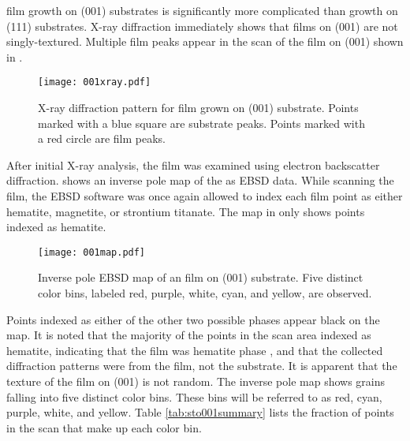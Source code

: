  film growth on (001) substrates is significantly more complicated than growth on (111) substrates. X-ray diffraction immediately shows that films on (001) are not singly-textured. Multiple film peaks appear in the \texttheta{} scan of the  film on (001) shown in . 
\begin{figure}
\centering
	\texttt{[image: 001xray.pdf]}
	\caption[XRD pattern for  film on ]{%
		X-ray diffraction pattern for  film grown on 
		 (001) substrate. Points marked with a blue 
		square are substrate peaks. Points marked with a red 
		circle are film peaks.}
	\label{fig:001xray}
\end{figure}
After initial X-ray analysis, the film was examined using electron backscatter diffraction.  shows an inverse pole map of the as EBSD data. While scanning the film, the EBSD software was once again allowed to index each film point as either hematite, magnetite, or strontium titanate. The map in  only shows points indexed as hematite. 
\begin{figure}
	\texttt{[image: 001map.pdf]}
	\caption[EBSD map of  film on  (001)]{%
		Inverse pole EBSD map of an  film on  (001) 
		substrate. Five distinct color bins, labeled red, purple, white, 
		cyan, and yellow, are observed.}
	\label{fig:001map}
\end{figure}
Points indexed as either of the other two possible phases appear black on the map. It is noted that the majority of the points in the scan area indexed as hematite, indicating that the film was hematite phase , and that the collected diffraction patterns were from the film, not the substrate. It is apparent that the texture of the film on (001) is not random. The inverse pole map shows grains falling into five distinct color bins. These bins will be referred to as red, cyan, purple, white, and yellow. Table \ref{tab:sto001summary} lists the fraction of points in the scan that make up each color bin. 

